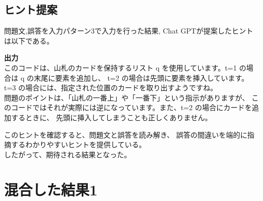 \subsection{ヒント提案}
問題文,誤答を入力パターン3で入力を行った結果,
Chat GPTが提案したヒントは以下である。
\begin{screen}
\textbf{出力}\\
このコードは、山札のカードを保持するリスト q を使用しています。t=1 の場合は q の末尾に要素を追加し、
t=2 の場合は先頭に要素を挿入しています。t=3 の場合には、指定された位置のカードを取り出すようですね。\\
問題のポイントは、「山札の一番上」や「一番下」という指示がありますが、
このコードではそれが実際には逆になっています。また、t=2 の場合にカードを追加するときに、
先頭に挿入してしまうことも正しくありません。
\end{screen}
このヒントを確認すると、問題文と誤答を読み解き、
誤答の間違いを端的に指摘するわかりやすいヒントを提供している。\\
したがって、期待される結果となった。



\section{混合した結果1}%

